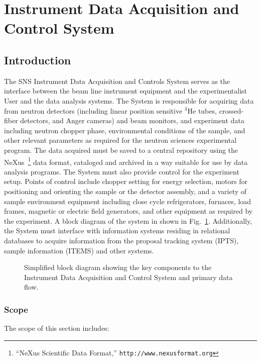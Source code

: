 
\section{Instrument Data Acquisition and Control System}


\subsection{Introduction}

The SNS Instrument Data Acquisition and Controls System serves as
the interface between the beam line instrument equipment and the
experimentalist User and the data analysis systems. The System is
responsible for acquiring data from neutron detectors (including
linear position sensitive $^3$He tubes, crossed-fiber detectors,
and Anger cameras) and  beam monitors, and experiment data including
neutron chopper phase, environmental conditions of the sample,
and other relevant parameters as required for the neutron sciences
experimental program. The data acquired must be saved to a central
repository using the NeXus~\footnote{``NeXus Scientific Data Format,''
\texttt{http://www.nexusformat.org}} data format, cataloged and
archived in a way suitable for use by data analysis programs.  The System
must also provide control for the experiment setup. Points of control
include chopper setting for energy selection, motors for positioning and
orienting the sample or the detector assembly, and a variety of sample
environment equipment including close cycle refrigerators, furnaces,
load frames, magnetic or electric field generators, and other equipment
as required by the experiment. A block diagram of the system in shown
in Fig.~\ref{blockdiagram}. Additionally, the System must interface
with information systems residing in relational databases to acquire
information from the proposal tracking system (IPTS), sample information
(ITEMS) and other systems.

\begin{figure}[htb]
	\centering
	\caption{Simplified block diagram showing the key components to
	the Instrument Data Acquisition and Control System and primary
	data flow.} 
	\label{blockdiagram}
\end{figure}

\subsubsection{Scope}
The scope of this section includes:

